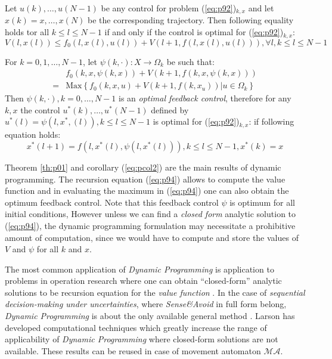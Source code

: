 \begin{corollary}
Let  $u(k),\dots,u(N-1)$ be any control for problem (\ref{eq:p92})$_{k,x}$ and let $x(k) = x,\dots,x(N)$ be the corresponding trajectory. Then following equality holds tor all $k \le l \le N-1$  if and only if the control is optimal for (\ref{eq:p92})$_{k,x}$:
\begin{equation}
    V(l,x(l)) \le f_0(l,x(l),u(l)) + V(l+1,f(l,x(l),u(l))), \forall l, k \le l \le N-1
\end{equation}
\end{corollary}
\begin{corollary}
For $k=0,1,\dots,N-1$, let $\psi(k,\cdot): X\to \Omega_k$ be such that:
\begin{equation}
    \begin{split}
    & f_0(k,x,\psi(k,x))+ V(k+1,f(k,x,\psi(k,x)))\\
    =&\text{Max}\left\{f_0(k,x,u)+ V(k+1,f(k,x_u))|u\in\Omega_k\right\}
    \end{split}
\end{equation}
\noindent Then $\psi(k,\cdot), k = 0,\dots,N-1$ is an \textit{optimal feedback control}, therefore for any $k,x$ the control $u^*(k),\dots,u^*(N-1)$ defined by $u^*(l)=\psi(l,x^*,(l)), k \le l \le N-1$ is optimal for (\ref{eq:p92})$_{k,x}$: if following equation holds:
\begin{equation}\label{eq:pcol2}
    x^*(l+1)=f(l,x^*(l),\psi(l,x^*(l))), k \le l \le N-1, x^*(k)=x
\end{equation}
\end{corollary}
\noindent Theorem \ref{th:p01} and corollary (\ref{eq:pcol2}) are the main results of dynamic programming. The recursion equation (\ref{eq:p94}) allows to compute the value function and in evaluating the maximum in (\ref{eq:p94}) one can also obtain the optimum feedback control. Note that this feedback control $\psi$ is optimum for all initial conditions, However unless we can find a \textit{closed form} analytic solution to (\ref{eq:p94}), the dynamic programming formulation may necessitate a prohibitive amount of computation, since we would have to compute and store the values of $V$ and $\psi$ for all $k$ and $x$.

The most common application of \textit{Dynamic Programming} is application to problems in operation research where one can obtain “closed-form” analytic solutions to be recursion equation for the \textit{value function} \cite{re1962applied,wagner1969principles}. In the case of \textit{sequential decision-making under uncertainties}, where \textit{Sense\&Avoid} in full form belong, \textit{Dynamic Programming} is about the only available general method \cite{howard1960dynamic}. Larson \cite{larson1968state} has developed computational techniques which greatly increase the range of applicability of \textit{Dynamic Programming} where closed-form solutions are not available. These results can be reused in case of movement automaton $\mathscr{MA}$.

